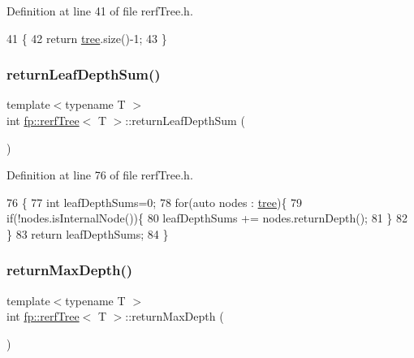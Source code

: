 Definition at line 41 of file rerf\+Tree.\+h.


\begin{DoxyCode}
41                                              \{
42                     \textcolor{keywordflow}{return} \hyperlink{classfp_1_1rerfTree_afc9392154cb4d1dde02e26a9ec31e356}{tree}.size()-1;
43                 \}
\end{DoxyCode}
\mbox{\label{classfp_1_1rerfTree_a206939d3e501ed273f07c211fa57e997}} 
\subsubsection{\texorpdfstring{return\+Leaf\+Depth\+Sum()}{returnLeafDepthSum()}}
{\footnotesize\ttfamily template$<$typename T $>$ \\
int \hyperlink{classfp_1_1rerfTree}{fp\+::rerf\+Tree}$<$ T $>$\+::return\+Leaf\+Depth\+Sum (\begin{DoxyParamCaption}{ }\end{DoxyParamCaption})\hspace{0.3cm}{\ttfamily [inline]}}



Definition at line 76 of file rerf\+Tree.\+h.


\begin{DoxyCode}
76                                                \{
77                     \textcolor{keywordtype}{int} leafDepthSums=0;
78                     \textcolor{keywordflow}{for}(\textcolor{keyword}{auto} nodes : \hyperlink{classfp_1_1rerfTree_afc9392154cb4d1dde02e26a9ec31e356}{tree})\{
79                         \textcolor{keywordflow}{if}(!nodes.isInternalNode())\{
80                             leafDepthSums += nodes.returnDepth();
81                         \}
82                     \}
83                     \textcolor{keywordflow}{return} leafDepthSums;
84                 \}
\end{DoxyCode}
\mbox{\label{classfp_1_1rerfTree_ac46ff8e95b8154fc3bfc492f4eb1c1c5}} 
\subsubsection{\texorpdfstring{return\+Max\+Depth()}{returnMaxDepth()}}
{\footnotesize\ttfamily template$<$typename T $>$ \\
int \hyperlink{classfp_1_1rerfTree}{fp\+::rerf\+Tree}$<$ T $>$\+::return\+Max\+Depth (\begin{DoxyParamCaption}{ }\end{DoxyParamCaption})\hspace{0.3cm}{\ttfamily [inline]}}



